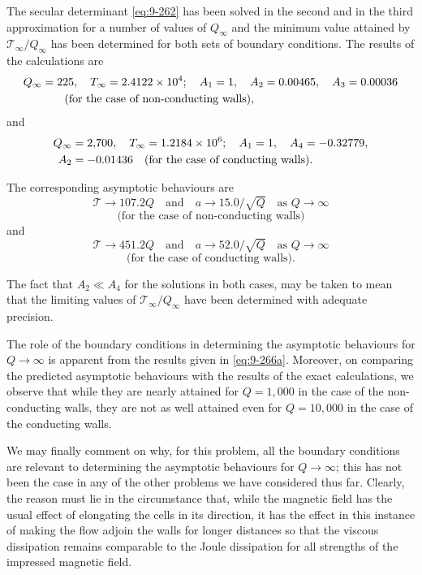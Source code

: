 The secular determinant \eqref{eq:9-262} has been solved in the second and in the third approximation for a number of values of $Q_\infty$ and the minimum value attained by $\mathscr{T}_\infty/Q_\infty$ has been determined for both sets of boundary conditions. The results of the calculations are
\begin{align}
Q_\infty &= 225, \quad \mathscr{T}_\infty = 2.4122 \times 10^4; \quad A_1 = 1, \quad A_2 = 0.00465, \quad A_3 = 0.00036 \notag \\
&\qquad \text{(for the case of non-conducting walls),} \label{eq:9-265}
\end{align}
and
\begin{align}
Q_\infty &= 2{,}700, \quad \mathscr{T}_\infty = 1.2184 \times 10^6; \quad A_1 = 1, \quad A_4 = -0.32779, \notag \\
A_2 &= -0.01436 \quad \text{(for the case of conducting walls).} \label{eq:9-265a}
\end{align}

The corresponding asymptotic behaviours are
\begin{equation}
\mathscr{T} \to 107.2Q \quad \text{and} \quad a \to 15.0/\sqrt{Q} \quad \text{as } Q \to \infty \label{eq:9-266a}
\end{equation}
\[
\text{(for the case of non-conducting walls)}
\]
and
\begin{equation}
\mathscr{T} \to 451.2Q \quad \text{and} \quad a \to 52.0/\sqrt{Q} \quad \text{as } Q \to \infty \label{eq:9-266b}
\end{equation}
\[
\text{(for the case of conducting walls).}
\]

The fact that $A_2 \ll A_4$ for the solutions in both cases, may be taken to mean that the limiting values of $\mathscr{T}_\infty/Q_\infty$ have been determined with adequate precision.

The role of the boundary conditions in determining the asymptotic behaviours for $Q \to \infty$ is apparent from the results given in \eqref{eq:9-266a}. Moreover, on comparing the predicted asymptotic behaviours with the results of the exact calculations, we observe that while they are nearly attained for $Q = 1{,}000$ in the case of the non-conducting walls, they are not as well attained even for $Q = 10{,}000$ in the case of the conducting walls.

We may finally comment on why, for this problem, all the boundary conditions are relevant to determining the asymptotic behaviours for $Q \to \infty$; this has not been the case in any of the other problems we have considered thus far. Clearly, the reason must lie in the circumstance that, while the magnetic field has the usual effect of elongating the cells in its direction, it has the effect in this instance of making the flow adjoin the walls for longer distances so that the viscous dissipation remains comparable to the Joule dissipation for all strengths of the impressed magnetic field.

